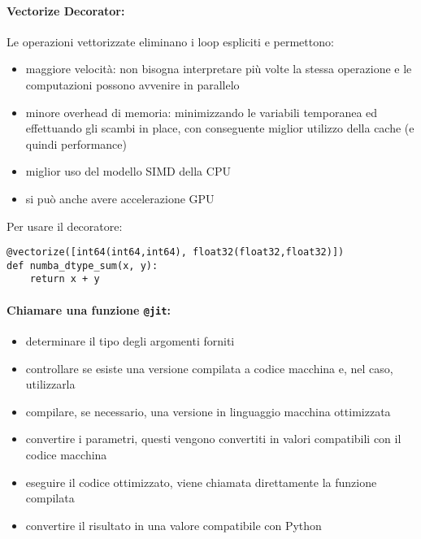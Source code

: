\paragraph{Vectorize Decorator:} Le operazioni vettorizzate eliminano i loop espliciti e permettono: 
\begin{itemize}
	\item maggiore velocità: non bisogna interpretare più volte la stessa operazione e le computazioni possono avvenire in parallelo
	
	\item minore overhead di memoria: minimizzando le variabili temporanea ed effettuando gli scambi in place, con conseguente miglior utilizzo della cache (e quindi performance)
	
	\item miglior uso del modello SIMD della CPU
	
	\item si può anche avere accelerazione GPU
\end{itemize}
Per usare il decoratore:
\begin{verbatim}
@vectorize([int64(int64,int64), float32(float32,float32)])
def numba_dtype_sum(x, y):
    return x + y
\end{verbatim}


\paragraph{Chiamare una funzione \texttt{@jit}:} 
\begin{itemize}
	\item determinare il tipo degli argomenti forniti
	
	\item controllare se esiste una versione compilata a codice macchina e, nel caso, utilizzarla
	
	\item compilare, se necessario, una versione in linguaggio macchina ottimizzata
	
	\item convertire i parametri, questi vengono convertiti in valori compatibili con il codice macchina
	
	\item eseguire il codice ottimizzato, viene chiamata direttamente la funzione compilata
	
	\item convertire il risultato in una valore compatibile con Python
\end{itemize}

